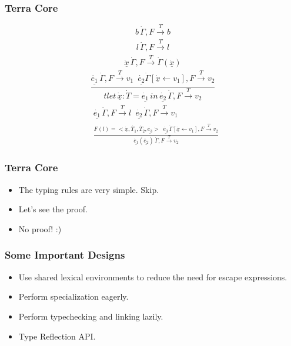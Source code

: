 \documentclass{beamer}
\begin{document}
\begin{frame}
	\frametitle{Terra Core}
  \begin{equation}
    b \, \dot{\Gamma}, F \xrightarrow[]{T} b \tag{TBAS}
  \end{equation}
  \begin{equation}
    l \, \dot{\Gamma}, F \xrightarrow[]{T} l \tag{TFUN}
  \end{equation}
  \begin{equation}
    \underline{\dot{x}} \, \dot{\Gamma}, F \xrightarrow[]{T} \dot{\Gamma}(\underline{\dot{x}}) \tag{TVAR}
  \end{equation}
  \begin{equation}
    \frac{\underline{\dot{e_1}} \, \dot{\Gamma}, F \xrightarrow[]{T} v_1 \enspace \underline{\dot{e_2}} \dot{\Gamma}[\underline{\dot{x}} \leftarrow v_1], F \xrightarrow[]{T} v_2}{tlet \, \underline{\dot{x}}: \dot{T} = \underline{\dot{e_1}} \, in \, \underline{\dot{e_2}} \, \dot{\Gamma}, F \xrightarrow[]{T} v_2} \tag{TLET}
  \end{equation}
  \begin{equation}
    \begin{split}
      & \underline{\dot{e_1}} \, \dot{\Gamma}, F \xrightarrow[]{T} l \enspace \underline{\dot{e_2}} \, \dot{\Gamma}, F \xrightarrow[]{T} v_1 \\
      & \frac{F(l) = <\underline{\dot{x}}, \dot{T_1}, \dot{T_2}, \underline{\dot{e_3}}> \enspace \underline{\dot{e_3}} \, \dot{\Gamma}[\underline{\dot{x}} \leftarrow v_1], F \xrightarrow[]{T} v_2}{\underline{\dot{e_1}}(\underline{\dot{e_2}}) \, \dot{\Gamma}, F \xrightarrow[]{T} v_2}
    \end{split}\tag{TAPP}
  \end{equation}
\end{frame}

\begin{frame}
	\frametitle{Terra Core}
  \begin{itemize}
  \item The typing rules are very simple. Skip.\pause
  \item Let's see the proof.\pause
  \item No proof! :)
  \end{itemize}
\end{frame}

\begin{frame}
  \frametitle{Some Important Designs}
  \begin{itemize}
  \item Use shared lexical environments to reduce the need for escape expressions.\pause
  \item Perform specialization eagerly.\pause
  \item Perform typechecking and linking lazily.\pause
  \item Type Reflection API.
  \end{itemize}
\end{frame}
\end{document}
